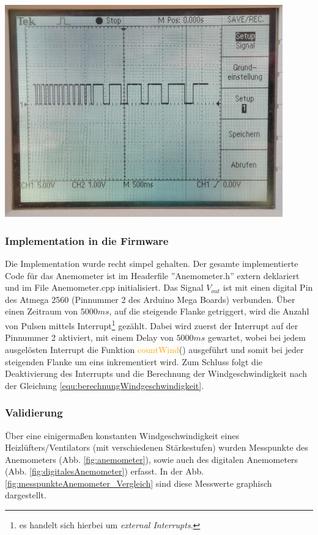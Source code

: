 {\begin{minipage}[b][650pt][t]{0.44\textwidth}
\label{fig:beschaltungAnemometer}
\vspace{20pt}
\includegraphics[width = 0.9\textwidth]{graphics/Anemometer/oszilloskop_anenometer_puls.png}
\label{fig:rechteckpuls_anemometer}
\end{minipage}}
\newpage

\subsubsection*{Implementation in die Firmware}
Die Implementation wurde recht simpel gehalten. Der gesamte implementierte Code für das Anemometer ist im Headerfile ''Anemometer.h'' extern deklariert und im File Anemometer.cpp initialisiert. Das Signal $V_{out}$ ist mit einen digital Pin des Atmega 2560 (Pinnummer 2 des Arduino Mega Boards) verbunden. Über einen Zeitraum von $5000ms$, auf die steigende Flanke getriggert, wird die Anzahl von Pulsen mittels Interrupt\footnote{es handelt sich hierbei um \textit{external Interrupts}.} gezählt. Dabei wird zuerst der Interrupt auf der Pinnummer 2 aktiviert, mit einem Delay von $5000ms$ gewartet, wobei bei jedem ausgelösten Interrupt die Funktion \textcolor{orange}{countWind}() ausgeführt und somit bei jeder steigenden Flanke um eins inkrementiert wird. Zum Schluss folgt die Deaktivierung des Interrupts und die Berechnung der Windgeschwindigkeit nach der Gleichung \ref{equ:berechnungWindgeschwindigkeit}.\\

\subsubsection*{Validierung}
Über eine einigermaßen konstanten Windgeschwindigkeit eines Heizlüfters/Ventilators (mit verschiedenen Stärkestufen) wurden Messpunkte des Anemometers (Abb. \ref{fig:anemometer}), sowie auch des digitalen Anemometers (Abb. \ref{fig:digitalesAnemometer}) erfasst. In der Abb. \ref{fig:messpunkteAnemometer_Vergleich} sind diese Messwerte graphisch dargestellt.\\

